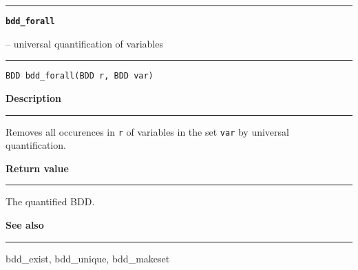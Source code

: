 \vspace{8ex}
\begin{minipage}{\textwidth}

\noindent\begin{minipage}{\textwidth}
\rule{\textwidth}{0.5mm}
{\tt\bf bdd\_forall }
\--- universal quantification of variables  \hspace{\fill}
\\\rule[1.5ex]{\textwidth}{0.5mm}
\end{minipage}

\noindent\begin{verbatim}
BDD bdd_forall(BDD r, BDD var) 
\end{verbatim}

\vspace{\parsep}\noindent
{\bf Description}\\\rule[1.5ex]{\textwidth}{0.2mm}\vspace{-1.5ex}\setlength{\parindent}{1em}
Removes all occurences in {\tt r} of variables in the set
           {\tt var} by universal quantification. 

\setlength{\parindent}{0em}\vspace{\parsep}\vspace{\baselineskip}\noindent
{\bf Return value}\\\rule[1.5ex]{\textwidth}{0.2mm}\vspace{-1.5ex}
The quantified BDD. 

\vspace{\parsep}\vspace{\baselineskip}\noindent
{\bf See also}\\\rule[1.5ex]{\textwidth}{0.2mm}\vspace{-1.5ex}
bdd\_exist, bdd\_unique, bdd\_makeset 
\end{minipage}
\vspace{8ex}
